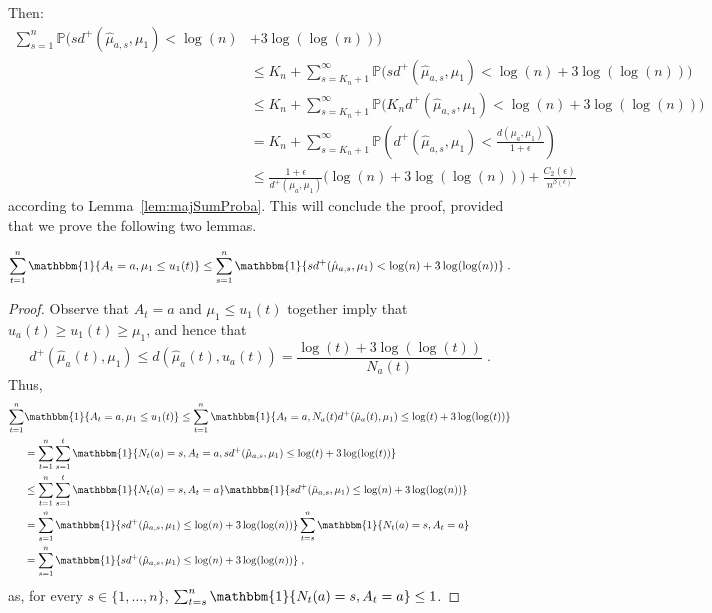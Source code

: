 \documentclass[wcp]{jmlr}
\renewcommand{\P}{\mathbb{P}}
\newcommand{\1}{\mathbbm{1}}
\begin{document}
{ Then:
\begin{align*}
  \sum_{s = 1}^n \P\big( sd^+(\hat{\mu}_{a,s}, \mu_1) < \log(n) &+ 3\log(\log(n))
  \big)\\
  &\leq K_n + \sum_{s=K_n+1}^\infty \P\Big(  sd^+(\hat{\mu}_{a,s}, \mu_1) < \log(n) + 3\log(\log(n)) \Big) \\
  &\leq K_n + \sum_{s=K_n+1}^\infty \P\Big(  K_nd^+(\hat{\mu}_{a,s}, \mu_1) <\log(n) + 3\log(\log(n)) \Big) \\
  &= K_n + \sum_{s=K_n+1}^\infty \P\left( d^+(\hat{\mu}_{a,s}, \mu_1) < \frac{d(\mu_a, \mu_1)}{1+\epsilon} \right) \\
  &\leq \frac{1+\epsilon}{d^+(\mu_a, \mu_1)}\Big( \log(n)+3\log(\log(n)) \Big)
  + \frac{C_2(\epsilon)}{n^{\beta(\epsilon)}}
\end{align*}
according to Lemma~\ref{lem:majSumProba}.
This will conclude the proof, provided that we prove the following two lemmas.

\begin{lemma}\label{lem:majN}
  \[ \sum_{t=1}^n \1\{A_t = a, \mu_1\leq u_1(t)\} \leq \sum_{s = 1}^n \1\{
  sd^+(\hat{\mu}_{a,s}, \mu_1) < \log(n) + 3\log(\log(n))\}\;.\]
\end{lemma}
\begin{proof}
  Observe that $A_t = a$ and $\mu_1\leq u_1(t)$ together imply that $u_a(t)
  \geq u_1(t) \geq \mu_1$, and hence that 
  \[d^+\left(\hat{\mu}_a(t), \mu_1\right) \leq d(\hat{\mu}_a(t), u_a(t)) =
  \frac{\log(t) + 3\log(\log(t))}{N_a(t)}\;.\] 
Thus,
  \begin{align*}
    \sum_{t=1}^n &\1\{A_t = a, \mu_1\leq u_1(t)\}
     \leq  \sum_{t=1}^n \1\{A_t = a, N_a(t)d^+(\hat{\mu}_a(t), \mu_1) \leq \log(t) + 3\log(\log(t))\}  \\
    & =  \sum_{t=1}^n \sum_{s=1}^t \1\{N_t(a)=s, A_t = a, sd^+(\hat{\mu}_{a,s}, \mu_1) \leq \log(t) + 3\log(\log(t))\} \\
    & \leq  \sum_{t=1}^n \sum_{s=1}^t \1\{N_t(a)=s, A_t = a\}\1\{sd^+(\hat{\mu}_{a,s}, \mu_1) \leq \log(n) + 3\log(\log(n))\} \\
    & = \sum_{s=1}^n \1\{sd^+(\hat{\mu}_{a,s}, \mu_1) \leq \log(n) + 3\log(\log(n))\}  \sum_{t=s}^n \1\{N_t(a)=s, A_t = a\}\\
    & = \sum_{s=1}^n \1\{sd^+(\hat{\mu}_{a,s}, \mu_1) \leq \log(n) +
    3\log(\log(n))\} \;,
  \end{align*}
  as, for every $s\in\{1,\dots,n\}$, $\sum_{t=s}^n \1\{N_t(a)=s, A_t = a\}\leq
  1$.
\end{proof}

}
\end{document}

